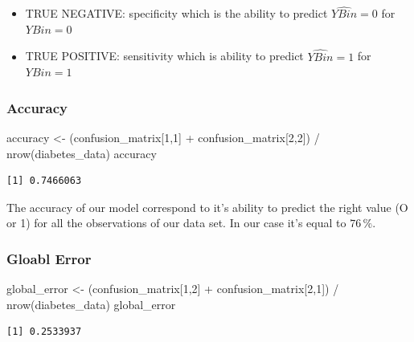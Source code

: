 \documentclass[
]{article}
\newenvironment{Shaded}{\begin{snugshade}}{\end{snugshade}}
\newcommand{\DecValTok}[1]{\textcolor[rgb]{0.00,0.00,0.81}{#1}}
\newcommand{\FunctionTok}[1]{\textcolor[rgb]{0.00,0.00,0.00}{#1}}
\newcommand{\NormalTok}[1]{#1}
\newcommand{\OtherTok}[1]{\textcolor[rgb]{0.56,0.35,0.01}{#1}}
\newcommand{\SpecialCharTok}[1]{\textcolor[rgb]{0.00,0.00,0.00}{#1}}
\begin{document}
\begin{itemize}
\item
  TRUE NEGATIVE: specificity which is the ability to predict
  \(\hat{YBin} = 0\) for \(YBin = 0\)
\item
  TRUE POSITIVE: sensitivity which is ability to predict
  \(\hat{YBin} = 1\) for \(YBin = 1\)
\end{itemize}

\hypertarget{accuracy}{%
\subsubsection{Accuracy}\label{accuracy}}

\begin{Shaded}
\begin{Highlighting}[]
\NormalTok{accuracy }\OtherTok{\textless{}{-}}\NormalTok{ (confusion\_matrix[}\DecValTok{1}\NormalTok{,}\DecValTok{1}\NormalTok{] }\SpecialCharTok{+}\NormalTok{ confusion\_matrix[}\DecValTok{2}\NormalTok{,}\DecValTok{2}\NormalTok{]) }\SpecialCharTok{/} \FunctionTok{nrow}\NormalTok{(diabetes\_data)}
\NormalTok{accuracy}
\end{Highlighting}
\end{Shaded}

\begin{verbatim}
[1] 0.7466063
\end{verbatim}

The accuracy of our model correspond to it's ability to predict the
right value (O or 1) for all the observations of our data set. In our
case it's equal to \(76\,\%\).

\hypertarget{gloabl-error}{%
\subsubsection{Gloabl Error}\label{gloabl-error}}

\begin{Shaded}
\begin{Highlighting}[]
\NormalTok{global\_error }\OtherTok{\textless{}{-}}\NormalTok{ (confusion\_matrix[}\DecValTok{1}\NormalTok{,}\DecValTok{2}\NormalTok{] }\SpecialCharTok{+}\NormalTok{ confusion\_matrix[}\DecValTok{2}\NormalTok{,}\DecValTok{1}\NormalTok{]) }\SpecialCharTok{/} \FunctionTok{nrow}\NormalTok{(diabetes\_data)}
\NormalTok{global\_error}
\end{Highlighting}
\end{Shaded}

\begin{verbatim}
[1] 0.2533937
\end{verbatim}
\end{document}
